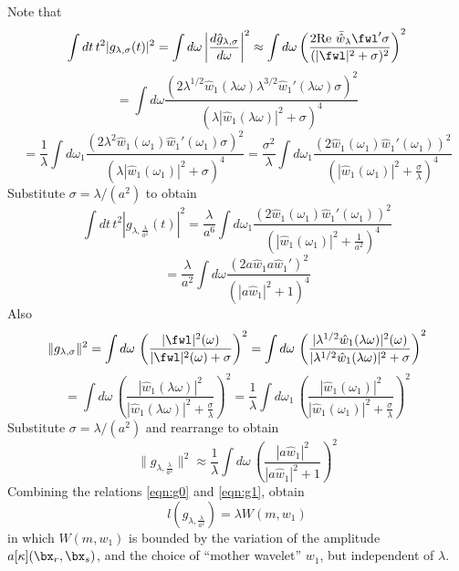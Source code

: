 Note that
\[
  \int dt\, t^2|g_{\lambda,\sigma}(t)|^2 = \int d\omega
  \left|\frac{d\hat{g}_{\lambda,\sigma}}{d\omega}\right|^2
  \approx \int d\omega  \left(\frac{2 \mbox{Re }\bar{\hat{w}}_{\lambda}\fwl' 
    \sigma}{(|\fwl|^2 + \sigma)^2}\right)^2
\]
\[
  =\int d\omega \frac{(2 \lambda^{1/2}\hat{w}_1(\lambda
    \omega)\lambda^{3/2}\hat{w}_1'(\lambda \omega) 
    \sigma)^2}{(\lambda|\hat{w}_1(\lambda
    \omega)|^2 + \sigma)^4}
\]
\[
  =\frac{1}{\lambda}\int d\omega_1 \frac{(2 \lambda^2\hat{w}_1(\omega_1)\hat{w}_1'( \omega_1) \sigma)^2}{(\lambda|\hat{w}_1(
    \omega_1)|^2 + \sigma)^4}
  =\frac{\sigma^2}{\lambda}\int d\omega_1
  \frac{(2\hat{w}_1(\omega_1)\hat{w}_1'( \omega_1)
    )^2}{\left(|\hat{w}_1(\omega_1)|^2 + \frac{\sigma}{\lambda}\right)^4}
\]
Substitute $\sigma = \lambda/(a^2)$ to obtain
\[
 \int dt\,
  t^2|g_{\lambda,\frac{\lambda}{a^2}}(t)|^2
  =\frac{\lambda}{a^6}\int d\omega_1
  \frac{(2\hat{w}_1(\omega_1)\hat{w}_1'( \omega_1)
    )^2}{\left(|\hat{w}_1(\omega_1)|^2 + \frac{1}{a^2}\right)^4}
\]
\begin{equation}
  \label{eqn:g1}
 = \frac{\lambda}{a^2} \int d\omega
  \frac{(2a\hat{w}_1a\hat{w}_1'
    )^2}{\left(|a\hat{w}_1|^2 + 1\right)^4}
\end{equation}
Also
\[
  \|g_{\lambda,\sigma}\|^2 = \int d\omega\,
  \left(\frac{|\fwl|^2(\omega)}{|\fwl|^2(\omega) + \sigma}\right)^2
= \int d\omega\,
  \left(\frac{|\lambda^{1/2}\hat{w}_1(\lambda
      \omega)|^2(\omega)}{|\lambda^{1/2}\hat{w}_1(\lambda
      \omega)|^2 + \sigma}\right)^2
\]
\[
=\int d\omega\,
  \left(\frac{|\hat{w}_1(\lambda
      \omega)|^2}{|\hat{w}_1(\lambda
      \omega)|^2 + \frac{\sigma}{\lambda}}\right)^2
=  \frac{1}{\lambda} \int d\omega_1\,
  \left(\frac{|\hat{w}_1(\omega_1)|^2}{|\hat{w}_1(\omega_1)|^2 + \frac{\sigma}{\lambda}}\right)^2
\]
Substitute $\sigma = \lambda/(a^2)$  and rearrange to obtain
\begin{equation}
  \label{eqn:g0}
  \|g_{\lambda,\frac{\lambda}{a^2}}\|^2 \approx \frac{1}{\lambda} \int d\omega\,
  \left(\frac{|a\hat{w}_1|^2}{|a\hat{w}_1|^2 + 1}\right)^2
\end{equation}
Combining the relations \ref{eqn:g0} and \ref{eqn:g1}, obtain
\begin{equation}
  \label{eqn:pwg}
  l(g_{\lambda,\frac{\lambda}{a^2}}) =\lambda W(m,w_1)
\end{equation}
in which $W(m,w_1)$ is bounded by the variation of the amplitude
$a[\kappa](\bx_r,\bx_s)$, and the choice of ``mother wavelet'' $w_1$, but
independent of $\lambda$.

